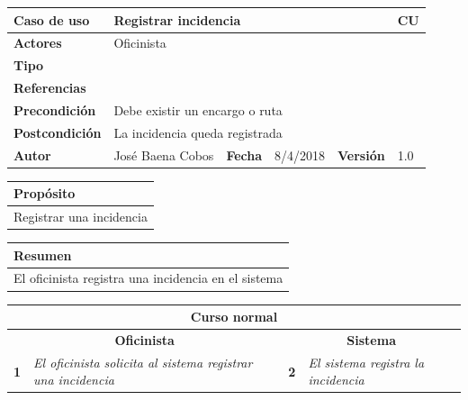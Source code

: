 \documentclass[12pt,spanish]{article}
\begin{document}
\begin{table}[H]
	\centering
	\begin{tabular}{|m{3cm}|m{4cm}|m{2cm}|m{2cm}|m{2cm}|m{1cm}|}
		\hline
		\textbf{Caso de uso} &  \multicolumn{4}{m{11cm}|}{Registrar incidencia} \vline &  \cellcolor{gray!40}CU\arabic{contadorCU}  \stepcounter{contadorCU} \\
		\hline
		\textbf{Actores} & \multicolumn{5}{m{11cm}|}{Oficinista} \\
		\hline
		\textbf{Tipo} & \multicolumn{5}{m{11cm}|}{} \\
		\hline
		\textbf{Referencias} &\multicolumn{5}{m{11cm}|}{} \\
		\hline
		\textbf{Precondición} & \multicolumn{5}{m{11cm}|}{Debe existir un encargo o ruta} \\
		\hline
		\textbf{Postcondición} & \multicolumn{5}{m{11cm}|}{La incidencia queda registrada} \\
		\hline
		\textbf{Autor} & José Baena Cobos & \textbf{Fecha} & 8/4/2018 & \textbf{Versión} & 1.0 \\
		\hline
	\end{tabular}
	
	\vspace{1cm}
	
	\begin{tabular}{|m{16.2cm}|}
		\hline
		\textbf{Propósito} \\
		\hline
		Registrar una incidencia\\
		\hline
	\end{tabular}
	
	\vspace{1cm}
	
	\begin{tabular}{|m{16.2cm}|}
		\hline
		\textbf{Resumen} \\
		\hline
		El oficinista registra una incidencia en el sistema\\
		\hline
	\end{tabular}
	
	\vspace{1cm}
	
	\begin{tabular}{|m{5pt}|m{7.33cm}|m{5pt}|m{7.33cm}|}
		\hline
		\multicolumn{4}{|c|}{\textbf{Curso normal}} \\
		\hline
		\multicolumn{2}{|c}{\textbf{Oficinista}} & \multicolumn{2}{|c|}{\textbf{Sistema}} \\
		\hline
		\textbf{1} & \textit{El oficinista solicita al sistema registrar una incidencia} & \textbf{2} & \textit{El sistema registra la incidencia} \\
		\hline
	

\end{tabular}
\end{table}
\end{document}
